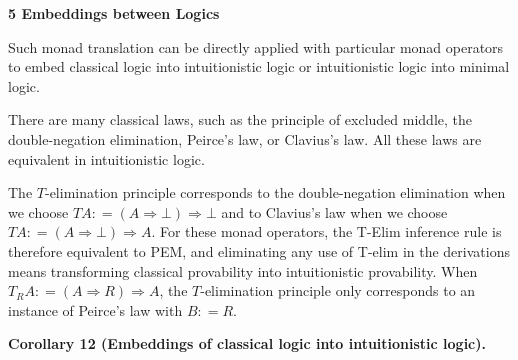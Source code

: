 \documentclass[10pt,a4paper]{article}
\begin{document}
 


 
\par\medskip\noindent\textbf{5 Embeddings between Logics}\par
 
 
Such monad translation can be directly applied with particular monad operators to embed classical logic into intuitionistic logic or intuitionistic logic into minimal logic.\par
 
 
 
There are many classical laws, such as the principle of excluded middle, the double-negation elimination, Peirce’s law, or Clavius’s law. All these laws are equivalent in intuitionistic logic.\par
 
\begin{center}\end{center}
 
The $T$-elimination principle corresponds to the double-negation elimination when we choose $TA\mathrel{\mathop{:}}=(A\mathbin{\Rightarrow}\bot)\mathbin{\Rightarrow}\bot$ and to Clavius’s law when we choose $TA\mathrel{\mathop{:}}=(A\mathbin{\Rightarrow}\bot)\mathbin{\Rightarrow}A$. For these monad operators, the T-Elim inference rule is therefore equivalent to PEM, and eliminating any use of T-elim in the derivations means transforming classical provability into intuitionistic provability. When $T_{R}A\mathrel{\mathop{:}}=(A\mathbin{\Rightarrow}R)\mathbin{\Rightarrow}A$, the $T$-elimination principle only corresponds to an instance of Peirce’s law with $B\mathrel{\mathop{:}}=R$.\par
 
 
 
\par\medskip\noindent\textbf{Corollary 12 (Embeddings of classical logic into intuitionistic logic).}\par
 
\end{document}
